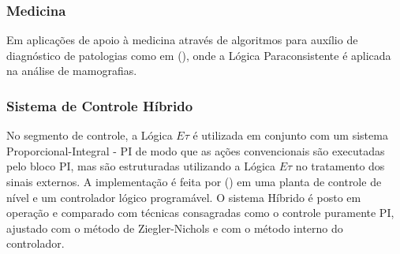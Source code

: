 \subsubsection{Medicina}

Em aplicações de apoio à medicina através de algoritmos para 
auxílio de diagnóstico de patologias como em 
\citeauthor{MauricioCM}(\citeyear{MauricioCM}), 
onde a Lógica Paraconsistente é aplicada na análise de mamografias.


\subsubsection{Sistema de Controle Híbrido}

No segmento de controle, a Lógica $E\tau$ é utilizada em conjunto com um 
sistema Proporcional-Integral - PI de modo que 
as ações convencionais são executadas pelo bloco PI, 
mas são estruturadas utilizando a Lógica $E\tau$ no 
tratamento dos sinais externos. 
A implementação é feita por 
\citeauthor{Marcelo}(\citeyear{Marcelo}) 
em uma planta de controle de nível e um
controlador lógico programável. 
O sistema Híbrido é posto em operação e 
comparado com técnicas consagradas como o 
controle puramente PI, ajustado com o
método de Ziegler-Nichols e com o 
método interno do controlador. 








